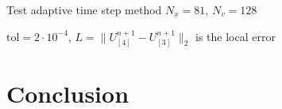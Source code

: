 \documentclass{beamer}
\begin{document}
\begin{frame}{Test adaptive time step method}
  $N_x = 81$, $N_v = 128$

  $\text{tol}=2\cdot10^{-4}$, $L = \| U^{n+1}_{[4]} - U^{n+1}_{[3]} \|_2$ is the local error
\end{frame}


\section{Conclusion}
\end{document}
